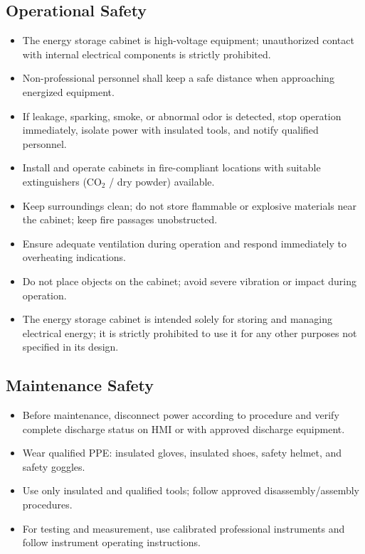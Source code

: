 \documentclass[11pt, a4paper]{article}
\begin{document}
\subsection{Operational Safety}
\begin{itemize}[leftmargin=1.5em]
    \item The energy storage cabinet is high-voltage equipment; unauthorized contact with internal electrical components is strictly prohibited.
    \item Non-professional personnel shall keep a safe distance when approaching energized equipment.
    \item If leakage, sparking, smoke, or abnormal odor is detected, stop operation immediately, isolate power with insulated tools, and notify qualified personnel.
    \item Install and operate cabinets in fire-compliant locations with suitable extinguishers (CO$_2$ / dry powder) available.
    \item Keep surroundings clean; do not store flammable or explosive materials near the cabinet; keep fire passages unobstructed.
    \item Ensure adequate ventilation during operation and respond immediately to overheating indications.
    \item Do not place objects on the cabinet; avoid severe vibration or impact during operation.
    \item The energy storage cabinet is intended solely for storing and managing electrical energy; it is strictly prohibited to use it for any other purposes not specified in its design.
\end{itemize}

\subsection{Maintenance Safety}
\begin{itemize}[leftmargin=1.5em]
    \item Before maintenance, disconnect power according to procedure and verify complete discharge status on HMI or with approved discharge equipment.
    \item Wear qualified PPE: insulated gloves, insulated shoes, safety helmet, and safety goggles.
    \item Use only insulated and qualified tools; follow approved disassembly/assembly procedures.
    \item For testing and measurement, use calibrated professional instruments and follow instrument operating instructions.
\end{itemize}
\end{document}
